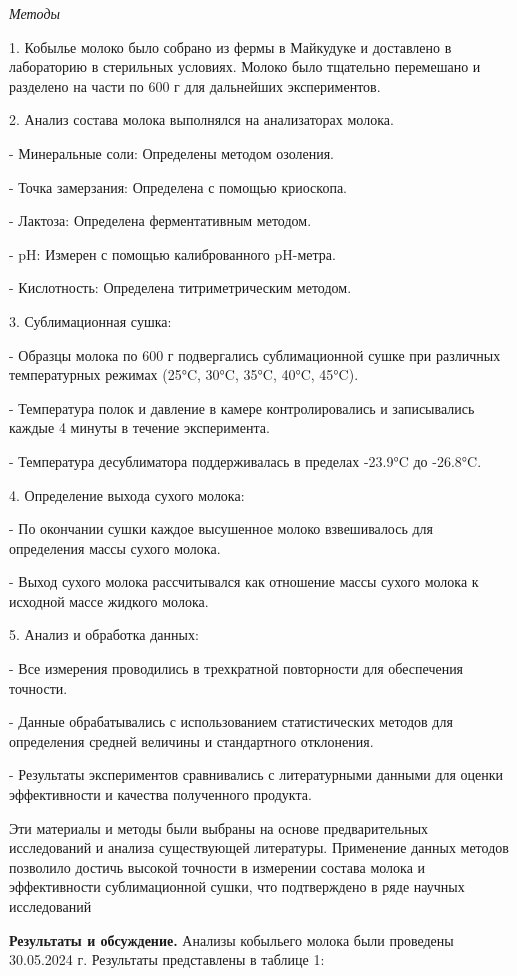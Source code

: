 \begin{multicols}{2}
\emph{Методы}

1. Кобылье молоко было собрано из фермы в Майкудуке и доставлено в
лабораторию в стерильных условиях. Молоко было тщательно перемешано и
разделено на части по 600 г для дальнейших экспериментов.

2. Анализ состава молока выполнялся на анализаторах молока.

- Минеральные соли: Определены методом озоления.

- Точка замерзания: Определена с помощью криоскопа.

- Лактоза: Определена ферментативным методом.

- pH: Измерен с помощью калиброванного pH-метра.

- Кислотность: Определена титриметрическим методом.

3. Сублимационная сушка:

- Образцы молока по 600 г подвергались сублимационной сушке при
различных температурных режимах (25°C, 30°C, 35°C, 40°C, 45°C).

- Температура полок и давление в камере контролировались и записывались
каждые 4 минуты в течение эксперимента.

- Температура десублиматора поддерживалась в пределах -23.9°C до
-26.8°C.

4. Определение выхода сухого молока:

- По окончании сушки каждое высушенное молоко взвешивалось для
определения массы сухого молока.

- Выход сухого молока рассчитывался как отношение массы сухого молока к
исходной массе жидкого молока.

5. Анализ и обработка данных:

- Все измерения проводились в трехкратной повторности для обеспечения
точности.

- Данные обрабатывались с использованием статистических методов для
определения средней величины и стандартного отклонения.

- Результаты экспериментов сравнивались с литературными данными для
оценки эффективности и качества полученного продукта.

Эти материалы и методы были выбраны на основе предварительных
исследований и анализа существующей литературы. Применение данных
методов позволило достичь высокой точности в измерении состава молока и
эффективности сублимационной сушки, что подтверждено в ряде научных
исследований

{\bfseries Результаты и обсуждение.} Анализы кобыльего молока были
проведены 30.05.2024 г. Результаты представлены в таблице 1:
\end{multicols}


